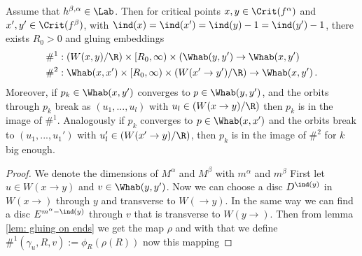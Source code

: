 \begin{prop}
	Assume that $h^{\beta,\alpha}\in \Lab$. Then for critical points $x,y\in \Crit(f^{\alpha})$ and $x',y'\in \Crit(f^{\beta})$, with $\ind(x)=\ind(x')=\ind(y)-1=\ind(y')-1$, there exists $R_0>0$ and gluing embeddings
	\begin{align*}
		\#^1&:(W(x,y)\slash \R) \times [R_0,\infty)\times (\Whab(y,y')\to \Whab(x,y')\\
		\#^2&: \Whab(x,x')\times [R_0,\infty)\times (W(x'\to y')\slash \R)\to \Whab(x,y') \,.
	\end{align*}
	Moreover, if $p_k\in \Whab(x,y')$ converges to $p\in \Whab(y,y')$, and the orbits through $p_k$ break as $(u_1,...,u_l)$ with $u_l\in (W(x\to y)\slash \R)$ then $p_k$ is in the image of $\#^1$. Analogously if $p_k$ converges to $p\in \Whab(x,x')$ and the orbits break to $(u_1,...,u_1')$ with $u_l'\in (W(x'\to y)\slash \R)$, then $p_k$ is in the image of $\#^2$ for $k$ big enough.
\end{prop}
\begin{proof} We denote the dimensions of $M^{\alpha}$ and $M^{\beta}$ with $m^{\alpha}$ and $m^{\beta}$
	First let $u\in W(x\to y)$ and $v\in \Whab(y,y')$. Now we can choose a disc $D^{\ind(y)}$ in $W(x\to)$ through $y$ and transverse to $W(\to y)$. In the same way we can find a disc $E^{m^{\alpha}-\ind(y)}$ through $v$ that is transverse to $W(y\to)$. Then from lemma \ref{lem: gluing on ends} we get the map $\rho$ and with that we define $\#^1(\gamma_u,R,v):=\phi_R(\rho(R))$ now this mapping \todo{}
\end{proof}